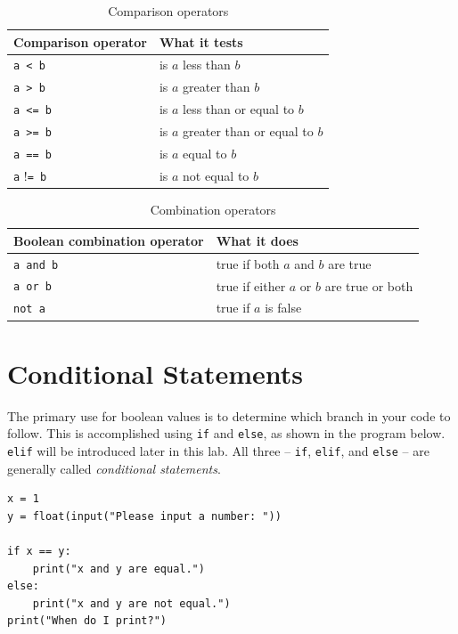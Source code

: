 \documentclass[11pt]{cselabheader}
\begin{document}
\begin{table}[!ht]
  \centering
  \begin{tabular}{ll}
    \toprule
    Comparison operator & What it tests\\
    \midrule
    \lstinline!a < b! & is $a$ less than $b$ \\
    \lstinline!a > b! & is $a$ greater than $b$ \\
    \lstinline!a <= b! & is $a$ less than or equal to $b$ \\
    \lstinline!a >= b! & is $a$ greater than or equal to $b$ \\
    \lstinline!a == b! & is $a$ equal to $b$ \\
    \lstinline!a! !\lstinline!= b! & is $a$ not equal to $b$ \\
    \bottomrule
  \end{tabular}
  \caption{Comparison operators}
  \label{tab:cmpops}
\end{table}

\begin{table}
  \centering
  \begin{tabular}{ll}
    \toprule
    Boolean combination operator & What it does \\
    \midrule
    \lstinline!a and b! & true if both $a$ and $b$ are true \\
    \lstinline!a or b! & true if either $a$ or $b$ are true or both\\
    \lstinline!not a! & true if $a$ is false\\
    \bottomrule
  \end{tabular}
  \caption{Combination operators}
  \label{tab:cmbops}
\end{table}

\pagebreak
\section{Conditional Statements}

The primary use for boolean values is to determine which branch in your code to
follow. This is accomplished using \lstinline{if} and \lstinline{else}, as shown
in the program below. \lstinline!elif! will be introduced later in this lab. All
three -- \lstinline!if!, \lstinline!elif!, and \lstinline!else! -- are generally
called \emph{conditional statements}.

\begin{lstlisting}[style=python]
x = 1
y = float(input("Please input a number: "))

if x == y:
    print("x and y are equal.")
else:
    print("x and y are not equal.")
print("When do I print?")
\end{lstlisting}
\end{document}
